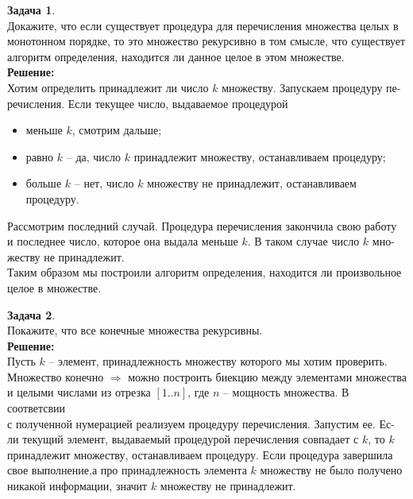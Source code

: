 \documentclass[a4paper,12pt]{article}
\theoremstyle{definition} %
\theoremstyle{definition} %
\newtheorem{problem}{Задача}[section]
\theoremstyle{remark} %
\begin{document}
\begin{problem}\ \\[1ex]
	Докажите, что если существует процедура для перечисления множества целых в \\[1ex] 
	монотонном порядке, то это множество рекурсивно в том смысле, что существует \\[1ex]
	алгоритм определения, находится ли данное целое в
	этом множестве. \\[2ex]
	
	\textbf{Решение:} \\[2ex]
	Хотим определить принадлежит ли число $k$ множеству. Запускаем процедуру пе- \\[1ex]
	речисления. Если текущее число, выдаваемое процедурой 
	\begin{itemize}
		\item меньше $k$, смотрим дальше;
		\item равно $k$ -- да, число $k$ принадлежит множеству, останавливаем процедуру;
		\item больше $k$ -- нет, число $k$ множеству не принадлежит, останавливаем процедуру.
	\end{itemize}
	Рассмотрим последний случай. Процедура перечисления закончила свою работу \\[1ex]
	и последнее число, которое она выдала меньше $k$. В таком случае число $k$ мно- \\[1ex]
	жеству не принадлежит. \\[1ex]
	Таким образом мы построили алгоритм определения, находится ли произвольное \\[1ex]
	целое в множестве. \\[4ex]
\end{problem}

\begin{problem}\ \\[1ex]
	Покажите, что все конечные множества рекурсивны. \\[2ex]
	
	\textbf{Решение:} \\[2ex]
	Пусть $k$ -- элемент, принадлежность множеству которого мы хотим проверить. \\[1ex]
	Множество конечно $\Rightarrow$ можно построить биекцию между элементами множества \\[1ex] 
	и целыми числами из отрезка	$[1..n]$, где $n$ -- мощность множества. В соответсвии \\[1ex] 
	с полученной нумерацией реализуем процедуру перечисления. Запустим ее. Ес- \\[1ex]
	ли текущий элемент, выдаваемый процедурой перечисления совпадает с $k$, то $k$ \\[1ex]
	принадлежит множеству, останавливаем процедуру. Если процедура завершила \\[1ex]
	свое выполнение,а про принадлежность элемента $k$ множеству не было получено \\[1ex]
	никакой информации, значит $k$ множеству не принадлежит.
\end{problem}
\end{document}
